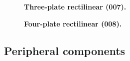 \documentclass[10pt,twoside,openany]{article}
\theoremstyle{definition}
\begin{document}
\begin{figure}
\begin{floatrow}
  {\caption{\label{fig:007}\textbf{Three-plate rectilinear (007).}}}
  {\caption{\label{fig:008}\textbf{Four-plate rectilinear (008).}}}
\end{floatrow}
\end{figure}

\subsection{Peripheral components}
\end{document}
